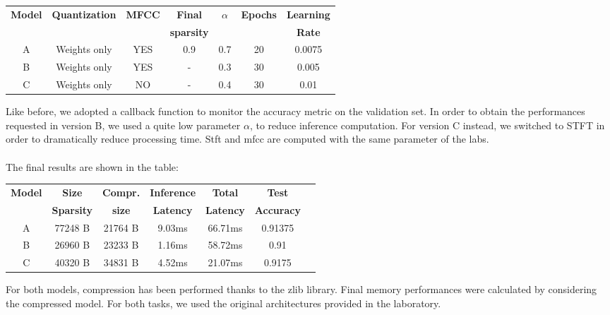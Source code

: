 \documentclass{article}
\begin{document}
\begin{center}
\begin{tabular}{|c|c|c|c|c|c|c|}
\hline
\vspace{-0.1cm}

\textbf{Model} &\textbf{Quantization} &\textbf{MFCC} &\textbf{Final} & \textbf{$\alpha$} &\textbf{Epochs} &\textbf{Learning} \\

&&&\textbf{sparsity}&&&\textbf{Rate} \\
\hline
A & Weights only & YES &0.9 & 0.7  & 20  & 0.0075\\
B& Weights only & YES &- &  0.3   & 30 & 0.005\\ 
C & Weights only & NO &- &  0.4   & 30 & 0.01\\ 

\hline
\end{tabular}
\end{center}
Like before, we adopted a callback function to monitor the accuracy metric on the validation set.
In order to obtain the performances requested in version B, we used a quite low parameter $\alpha$, to reduce inference computation. For version C instead, we switched to STFT in order to dramatically reduce processing time.
Stft and mfcc are computed with the same parameter of the labs.
\\\\
The final results are shown in the table:
\begin{center}
\begin{tabular}{|c|c|c|c|c|c|c|}
\hline
\vspace{-0.1cm}

\textbf{Model} &\textbf{Size} &\textbf{Compr.}&  \textbf{Inference }& \textbf{Total}  &\textbf{Test} \\
&\textbf{Sparsity}&\textbf{size}&\textbf{Latency}&\textbf{Latency}&\textbf{Accuracy}\\
\hline
A  & 77248 B & 21764 B & 9.03ms&   66.71ms  & 0.91375 \\ 
B  & 26960 B & 23233 B  &  1.16ms& 58.72ms & 0.91 \\ 
C  & 40320 B & 34831 B  & 4.52ms & 21.07ms  & 0.9175 \\ 

\hline
\end{tabular}
\end{center}

For both models, compression has been performed thanks to the zlib library. Final memory performances were calculated by considering the compressed model.
For both tasks, we used the original architectures provided in the laboratory.
\end{document}
